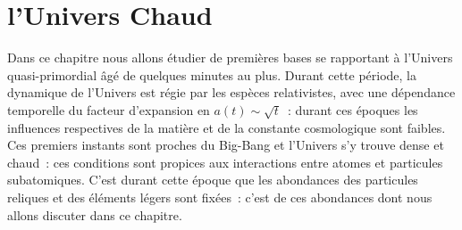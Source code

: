 
\chapter{l'Univers Chaud}
Dans ce chapitre nous allons étudier de premières bases se rapportant à l'Univers quasi-primordial âgé de quelques minutes au plus. Durant cette période, la dynamique de l'Univers est régie par les espèces relativistes, avec une dépendance temporelle du facteur d'expansion en $a(t)\sim\sqrt{t}$~: durant ces époques les influences respectives de la matière et de la constante cosmologique sont faibles. Ces premiers instants sont proches du Big-Bang et l'Univers s'y trouve dense et chaud~: ces conditions sont propices aux interactions entre atomes et particules subatomiques. C'est durant cette époque que les abondances des particules reliques et des éléments légers sont fixées~: c'est de ces abondances dont nous allons discuter dans ce chapitre.

